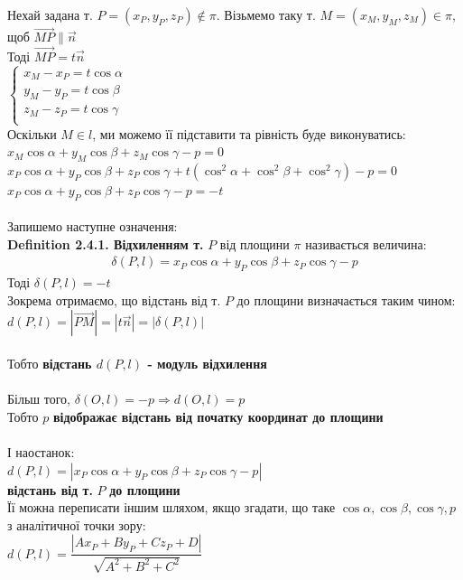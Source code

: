 \documentclass[a4paper, 14pt]{extarticle}
\def\defin#1{\textbf{Definition {#1}}}
\begin{document}
Нехай задана т. $P = (x_P, y_P, z_P) \not \in \pi$. Візьмемо таку т. $M = (x_M, y_M, z_M) \in \pi$, щоб $\overrightarrow{MP} \parallel \vec{n}$\\
Тоді $\overrightarrow{MP} = t \vec{n}$\\
$\begin{cases}
x_M - x_P = t \cos \alpha\\
y_M - y_P = t \cos \beta\\
z_M - z_P = t \cos \gamma\\
\end{cases}
$\\
Оскільки $M \in l$, ми можемо її підставити та рівність буде виконуватись:\\
$x_M \cos \alpha + y_M \cos \beta + z_M \cos \gamma - p = 0$\\
$x_P \cos \alpha + y_P \cos \beta + z_P \cos \gamma + t(\cos^2 \alpha + \cos^2 \beta + \cos^2 \gamma) - p = 0$\\
$x_P \cos \alpha + y_P \cos \beta + z_P \cos \gamma -p = -t$\\
\\
Запишемо наступне означення:\\
\defin{2.4.1. Відхиленням т.} $P$ від площини $\pi$ називається величина:
\begin{align*}
\delta(P,l) = x_P \cos \alpha + y_P \cos \beta + z_P \cos \gamma - p
\end{align*}
Тоді $\delta(P,l)=-t$\\
Зокрема отримаємо, що відстань від т. $P$ до площини визначається таким чином:\\
$d(P,l)=|\overrightarrow{PM}| = |t \vec{n}| = |\delta(P,l)|$\\
\\
Тобто \textbf{відстань $d(P,l)$ - модуль відхилення}\\
\\
Більш того, $\delta(O,l) = -p \Rightarrow d(O,l) = p$\\
Тобто $p$ \textbf{відображає відстань від початку координат до площини}\\
\\
І наостанок:\\
$d(P,l) = |x_P \cos \alpha + y_P \cos \beta + z_P \cos \gamma - p|$\\
\textbf{відстань від т.} $P$ \textbf{до площини}\\
Її можна переписати іншим шляхом, якщо згадати, що таке $\cos \alpha, \cos \beta, \cos \gamma, p$ з аналітичної точки зору:\\
$d(P,l) = \dfrac{|Ax_P + By_P + Cz_P + D|}{\sqrt{A^2+B^2+C^2}}$
\\
\end{document}
